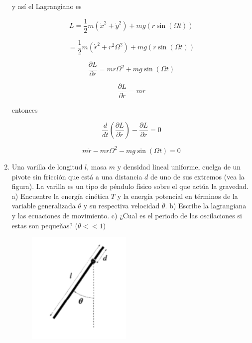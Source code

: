 \documentclass[12pt,a4paper]{article}
\begin{document}
\begin{enumerate}
    y así el Lagrangiano es
    
    \begin{equation*}
        L = \frac{1}{2} m (\dot{x}^2 + \dot{y}^2) + mg ( r \sin{(\Omega t)})
    \end{equation*}
    
    \begin{equation*}
        = \frac{1}{2} m (\dot{r}^2 + r^2 \Omega^2) + mg ( r \sin{(\Omega t)})
    \end{equation*}
    
    \begin{equation*}
        \frac{\partial L}{ \partial r} =  m r \Omega^2  + mg \sin{(\Omega t)}  
    \end{equation*}
    
    \begin{equation*}
        \frac{\partial L}{ \partial \dot{r}} = m \dot{r}  
    \end{equation*}
    
    entonces
    
    \begin{equation*}
        \frac{d}{dt} \left(\frac{\partial L}{\partial \dot{r}}\right) - \frac{\partial L}{\partial r} = 0
    \end{equation*}
    
    \begin{equation*}
        m \ddot{r} -  m r \Omega^2  - mg \sin{(\Omega t)} = 0
    \end{equation*}
    
    
    
    
    
    
    \item Una varilla de longitud $l$, masa $m$ y densidad lineal uniforme, cuelga de un pivote sin fricción que está a una distancia $d$ de uno de sus extremos (vea la figura). La varilla es un tipo de péndulo físico sobre el que actúa la gravedad. a) Encuentre la energía cinética $T$ y la energía potencial en términos de la variable generalizada $\theta$ y su respectiva velocidad $\dot{\theta}$. b) Escribe la lagrangiana y las ecuaciones de movimiento. c) ¿Cual es el periodo de las oscilaciones si estas son pequeñas? ($\theta << 1$)
    
    \begin{figure}[h!]
        \centering
        \includegraphics{2.PNG}
    \end{figure}
    

\end{enumerate}
\end{document}
